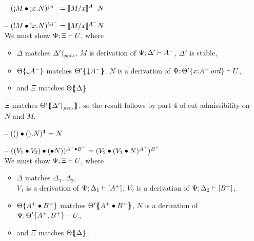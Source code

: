 \begin{itemize}


\item[--] $(\subst{\tgnabr{M}}{\tgnabl{x}{N}})^{{\scriptgnab}A^-}
           = \rsubsta{M}{x}{N}{A^-}$

\item[--] $(\subst{\tbangr{M}}{\tbangl{x}{N}})^{{!}A^-}
           = \rsubsta{M}{x}{N}{A^-}$ \smallskip\\
  We must show $\foc{\Psi}{\Xi}{U}$, where
  \begin{itemize}
  \item $\Delta$ matches $\restrictto{\Delta'}{\mpers}$,
        $M$ is derivation of $\foc{\Psi}{\Delta'}{A^-}$, 
        $\Delta'$ is stable,
  \item $\tackon{\Theta}{{\downarrow}A^-}$ matches 
        $\frameoff{\Theta'}{{\downarrow}A^-}$,
        $N$ is a derivation of 
        $\foc{\Psi}{\tackon{\Theta'}{x{:}\istrue{A^-}}}{U}$,
  \item and $\Xi$ matches $\frameoff{\Theta}{\Delta}$.
  \end{itemize}

  $\Xi$ matches $\frameoff{\Theta'}{\restrictto{\Delta'}{\mpers}}$,
  so the result follows by
  part 4 of cut admissibility on $N$ and $M$. 

\smallskip

\item[--] $(\subst{\toner}{\tonel{N}})^{\one} = N$

\item[--] $(\subst{(\tfuser{V_1}{V_2})}{(\tfusel{N}}))^{A^+ \fuse B^+}
           = (\subst{V_2}{(\subst{V_1}{N})^{A^+}})^{B^+}$ \smallskip\\
  We must show $\foc{\Psi}{\Xi}{U}$, where
  \begin{itemize}
  \item $\Delta$ matches $\Delta_1, \Delta_2$,\\
        $V_1$ is a derivation of $\foc{\Psi}{\Delta_1}{[A^+]}$,
        $V_2$ is a derivation of $\foc{\Psi}{\Delta_2}{[B^+]}$,
  \item $\tackon{\Theta}{A^+ \fuse B^+}$ matches
        $\frameoff{\Theta'}{A^+ \fuse B^+}$, 
        $N$ is a derivation of 
        $\foc{\Psi}{\tackon{\Theta'}{A^+, B^+}}{U}$, 
  \item and $\Xi$ matches $\frameoff{\Theta}{\Delta}$.
  \end{itemize}


\end{itemize}
